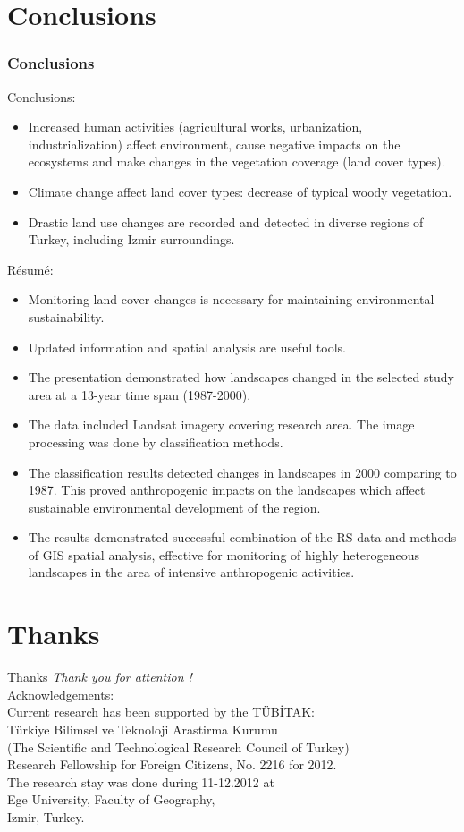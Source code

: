 \documentclass[pdflatex,compress,8pt,
	xcolor={dvipsnames,dvipsnames,svgnames,x11names,table},
	hyperref={colorlinks = true,
	breaklinks = true, 
	urlcolor = NavyBlue, 
	breaklinks = true}]{beamer}
\begin{document}
\section{Conclusions}
\begin{frame}\frametitle{Conclusions}
Conclusions: 
\begin{itemize}
	\item Increased human activities (agricultural works, urbanization, industrialization) affect environment, cause negative impacts on the ecosystems and make changes in the vegetation coverage (land cover types).
	\item Climate change affect land cover types: decrease of typical woody vegetation.
	\item Drastic land use changes are recorded and detected in diverse regions of Turkey, including Izmir surroundings.
\end{itemize}
R\'{e}sum\'{e}:
\begin{itemize}
	\item Monitoring land cover changes is necessary for maintaining environmental sustainability. 
	\item Updated information and spatial analysis are useful tools.
	\item The presentation demonstrated how landscapes changed in the selected study area at a 13-year time span (1987-2000).
	\item The data included Landsat imagery covering research area. The image processing was done by classification methods.
	\item The classification results detected changes in landscapes in 2000 comparing to 1987. This proved anthropogenic impacts on the landscapes which affect sustainable environmental development of the region.
	\item The results demonstrated successful combination of the RS data and methods of GIS spatial analysis, effective for monitoring of highly heterogeneous landscapes in the area of intensive anthropogenic activities.
\end{itemize}
\end{frame}

\section{Thanks}
\begin{frame}{Thanks}
  	\centering \LARGE 
  	\emph{Thank you for attention !}\\
	\vspace{5em}
\normalsize
Acknowledgements: \\
Current research has been supported by the T\"{U}BİTAK: \\
T\"{u}rkiye Bilimsel ve Teknoloji Arastirma Kurumu\\
(The Scientific and Technological Research Council of Turkey) \\
Research Fellowship for Foreign Citizens, No. 2216 for 2012.\\
The research stay was done during 11-12.2012 at \\
Ege University, Faculty of Geography,\\
Izmir, Turkey.
\end{frame}
\end{document}
